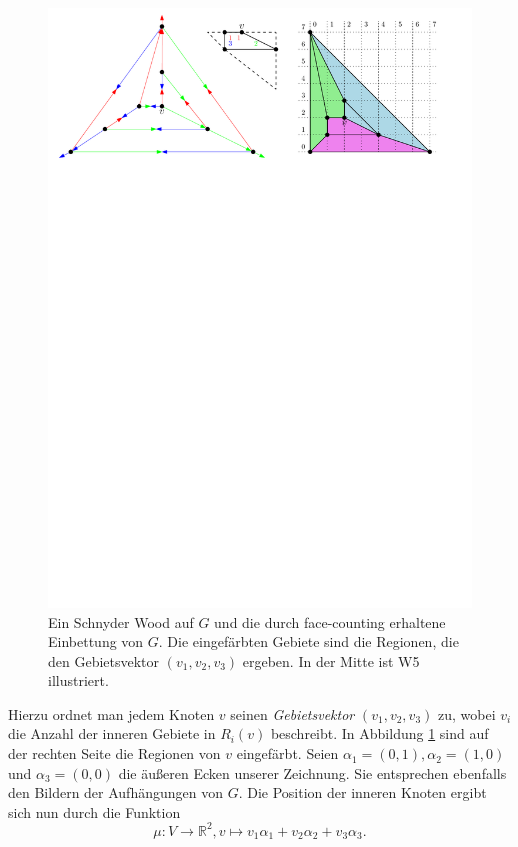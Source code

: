 \begin{figure}
	\centering
  \includegraphics[width=1\textwidth]{face_counting.pdf}
	\caption{Ein Schnyder Wood auf $G$ und die durch face-counting erhaltene Einbettung von $G$. Die eingefärbten Gebiete sind die Regionen, die den Gebietsvektor $(v_1,v_2,v_3)$ ergeben. In der Mitte ist W5 illustriert.}
	\label{face_counting_pic}
\end{figure}

Hierzu ordnet man jedem Knoten $v$ seinen \textit{Gebietsvektor} $(v_1,v_2,v_3)$ zu, wobei $v_i$ die Anzahl der inneren Gebiete in $R_i(v)$ beschreibt. In Abbildung \ref{face_counting_pic} sind auf der rechten Seite die Regionen von $v$ eingefärbt. Seien $\alpha_1 = (0,1),\alpha_2 = (1,0)$ und $\alpha_3 = (0,0)$ die äußeren Ecken unserer Zeichnung. Sie entsprechen ebenfalls den Bildern der Aufhängungen von $G$. Die Position der inneren Knoten ergibt sich nun durch die Funktion 
$$\mu: V \to \mathbb{R}^2,v\mapsto v_1\alpha_1 + v_2\alpha_2+v_3\alpha_3.$$ 

